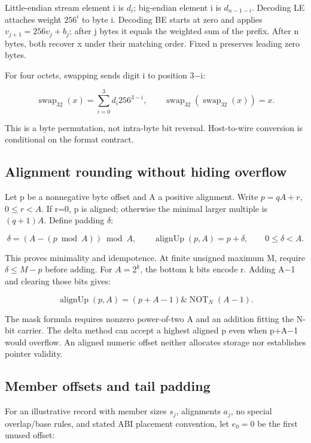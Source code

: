 Little-endian stream element i is \(d_i\); big-endian element i is \(d_{n-1-i}\). Decoding LE attaches weight \(256^i\) to byte i. Decoding BE starts at zero and applies \(v_{j+1}=256v_j+b_j\); after j bytes it equals the weighted sum of the prefix. After n bytes, both recover x under their matching order. Fixed n preserves leading zero bytes.

For four octets, swapping sends digit i to position 3−i:

\[
\operatorname{swap}_{32}(x)=\sum_{i=0}^{3}d_i256^{3-i},\qquad
\operatorname{swap}_{32}(\operatorname{swap}_{32}(x))=x.
\]

This is a byte permutation, not intra-byte bit reversal. Host-to-wire conversion is conditional on the format contract.

\subsection{Alignment rounding without hiding overflow}\label{03-visual-computing-i-ch018-alignment-rounding-without-hiding-overflow}

Let p be a nonnegative byte offset and A a positive alignment. Write \(p=qA+r\), \(0\le r<A\). If r=0, p is aligned; otherwise the minimal larger multiple is \((q+1)A\). Define padding \(\delta\):

\[
\delta=(A-(p\bmod A))\bmod A,\qquad
\operatorname{alignUp}(p,A)=p+\delta,\qquad 0\le\delta<A.
\]

This proves minimality and idempotence. At finite unsigned maximum M, require \(\delta\le M-p\) before adding. For \(A=2^k\), the bottom k bits encode r. Adding A−1 and clearing those bits gives:

\[
\operatorname{alignUp}(p,A)=(p+A-1)\mathbin{\&}\operatorname{NOT}_N(A-1).
\]

The mask formula requires nonzero power-of-two A and an addition fitting the N-bit carrier. The delta method can accept a highest aligned p even when p+A−1 would overflow. An aligned numeric offset neither allocates storage nor establishes pointer validity.

\subsection{Member offsets and tail padding}\label{03-visual-computing-i-ch018-member-offsets-and-tail-padding}

For an illustrative record with member sizes \(s_j\), alignments \(a_j\), no special overlap/base rules, and stated ABI placement convention, let \(e_0=0\) be the first unused offset:

